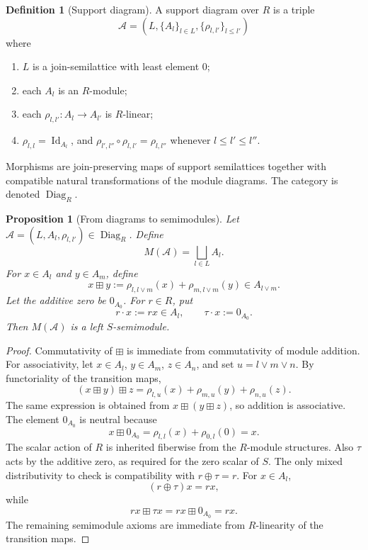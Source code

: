 \documentclass[11pt]{article}
\newcommand{\Id}{\operatorname{Id}}
\theoremstyle{plain}
\newtheorem{proposition}[theorem]{Proposition}
\theoremstyle{definition}
\newtheorem{definition}[theorem]{Definition}
\begin{document}
\begin{definition}[Support diagram]\label{def:support-diagram}
A support diagram over \(R\) is a triple
\[
   \mathcal A=(L,\{A_l\}_{l\in L},\{\rho_{l,l'}\}_{l\le l'})
\]
where
\begin{enumerate}[label=\textup{(\arabic*)}]
\item \(L\) is a join-semilattice with least element \(0\);
\item each \(A_l\) is an \(R\)-module;
\item each \(\rho_{l,l'}:A_l\to A_{l'}\) is \(R\)-linear;
\item \(\rho_{l,l}=\Id_{A_l}\), and \(\rho_{l',l''}\circ\rho_{l,l'}=\rho_{l,l''}\) whenever \(l\le l'\le l''\).
\end{enumerate}
Morphisms are join-preserving maps of support semilattices together with compatible natural transformations of the module diagrams.  The category is denoted \(\operatorname{Diag}_R\).
\end{definition}

\begin{proposition}[From diagrams to semimodules]\label{prop:diag-to-semi}
Let \(\mathcal A=(L,A_l,\rho_{l,l'})\in\operatorname{Diag}_R\).  Define
\[
   M(\mathcal A)=\bigsqcup_{l\in L}A_l.
\]
For \(x\in A_l\) and \(y\in A_m\), define
\[
   x\boxplus y:=\rho_{l,l\vee m}(x)+\rho_{m,l\vee m}(y)\in A_{l\vee m}.
\]
Let the additive zero be \(0_{A_0}\).  For \(r\in R\), put
\[
   r\cdot x:=rx\in A_l,
   \qquad
   \tau\cdot x:=0_{A_0}.
\]
Then \(M(\mathcal A)\) is a left \(S\)-semimodule.
\end{proposition}

\begin{proof}
Commutativity of \(\boxplus\) is immediate from commutativity of module addition.  For associativity, let \(x\in A_l\), \(y\in A_m\), \(z\in A_n\), and set \(u=l\vee m\vee n\).  By functoriality of the transition maps,
\[
   (x\boxplus y)\boxplus z
   =\rho_{l,u}(x)+\rho_{m,u}(y)+\rho_{n,u}(z).
\]
The same expression is obtained from \(x\boxplus(y\boxplus z)\), so addition is associative.  The element \(0_{A_0}\) is neutral because
\[
   x\boxplus 0_{A_0}=\rho_{l,l}(x)+\rho_{0,l}(0)=x.
\]
The scalar action of \(R\) is inherited fiberwise from the \(R\)-module structures.  Also \(\tau\) acts by the additive zero, as required for the zero scalar of \(S\).  The only mixed distributivity to check is compatibility with \(r\oplus\tau=r\).  For \(x\in A_l\),
\[
   (r\oplus\tau)x=rx,
\]
while
\[
   rx\boxplus \tau x=rx\boxplus 0_{A_0}=rx.
\]
The remaining semimodule axioms are immediate from \(R\)-linearity of the transition maps.
\end{proof}
\end{document}
